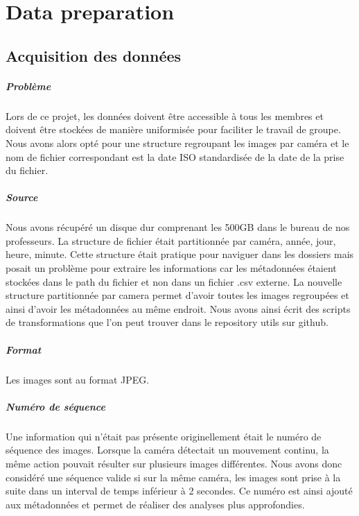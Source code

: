 \chapter{Data preparation}

\section{Acquisition des données}

\paragraph*{Problème} Lors de ce projet, les données doivent être accessible à tous les membres et doivent être stockées de manière uniformisée pour faciliter le travail de groupe. Nous avons alors opté pour une structure regroupant les images par caméra et le nom de fichier correspondant est la date ISO standardisée de la date de la prise du fichier.

\paragraph*{Source} Nous avons récupéré un disque dur comprenant les 500GB dans le bureau de nos professeurs. La structure de fichier était partitionnée par caméra, année, jour, heure, minute. Cette structure était pratique pour naviguer dans les dossiers mais posait un problème pour extraire les informations car les métadonnées étaient stockées dans le path du fichier et non dans un fichier .csv externe. La nouvelle structure partitionnée par camera permet d'avoir toutes les images regroupées et ainsi d'avoir les métadonnées au même endroit. Nous avons ainsi écrit des scripts de transformations que l'on peut trouver dans le repository utils sur github.

\paragraph*{Format} Les images sont au format JPEG.

\paragraph*{Numéro de séquence} Une information qui n'était pas présente originellement était le numéro de séquence des images. Lorsque la caméra détectait un mouvement continu, la même action pouvait résulter sur plusieurs images différentes. Nous avons donc considéré une séquence valide si sur la même caméra, les images sont prise à la suite dans un interval de temps inférieur à 2 secondes. Ce numéro est ainsi ajouté aux métadonnées et permet de réaliser des analyses plus approfondies.

